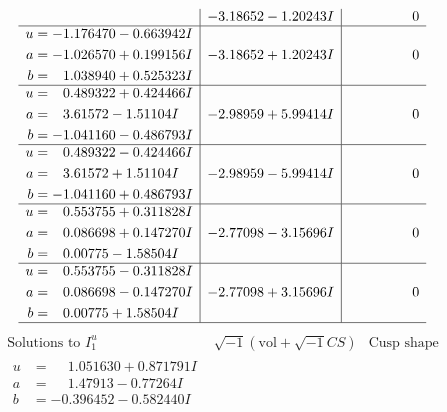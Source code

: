\documentclass[1p]{elsarticle_modified}
\theoremstyle{definition}
\newcommand{\I}{\sqrt{-1}}
\begin{document}
$$\begin{array}{c|c|c}
 & -3.18652 - 1.20243 I & \phantom{-0.000000 } 0 \\ \hline\begin{aligned}
u &= -1.176470 - 0.663942 I \\
a &= -1.026570 + 0.199156 I \\
b &= \phantom{-}1.038940 + 0.525323 I\end{aligned}
 & -3.18652 + 1.20243 I & \phantom{-0.000000 } 0 \\ \hline\begin{aligned}
u &= \phantom{-}0.489322 + 0.424466 I \\
a &= \phantom{-}3.61572 - 1.51104 I \\
b &= -1.041160 - 0.486793 I\end{aligned}
 & -2.98959 + 5.99414 I & \phantom{-0.000000 } 0 \\ \hline\begin{aligned}
u &= \phantom{-}0.489322 - 0.424466 I \\
a &= \phantom{-}3.61572 + 1.51104 I \\
b &= -1.041160 + 0.486793 I\end{aligned}
 & -2.98959 - 5.99414 I & \phantom{-0.000000 } 0 \\ \hline\begin{aligned}
u &= \phantom{-}0.553755 + 0.311828 I \\
a &= \phantom{-}0.086698 + 0.147270 I \\
b &= \phantom{-}0.00775 - 1.58504 I\end{aligned}
 & -2.77098 - 3.15696 I & \phantom{-0.000000 } 0 \\ \hline\begin{aligned}
u &= \phantom{-}0.553755 - 0.311828 I \\
a &= \phantom{-}0.086698 - 0.147270 I \\
b &= \phantom{-}0.00775 + 1.58504 I\end{aligned}
 & -2.77098 + 3.15696 I & \phantom{-0.000000 } 0\\
 \hline 
 \end{array}$$\newpage$$\begin{array}{c|c|c}  
\text{Solutions to }I^u_{1}& \I (\text{vol} + \sqrt{-1}CS) & \text{Cusp shape}\\
 \hline 
\begin{aligned}
u &= \phantom{-}1.051630 + 0.871791 I \\
a &= \phantom{-}1.47913 - 0.77264 I \\
b &= -0.396452 - 0.582440 I\end{aligned}

\end{array}$$
\end{document}
